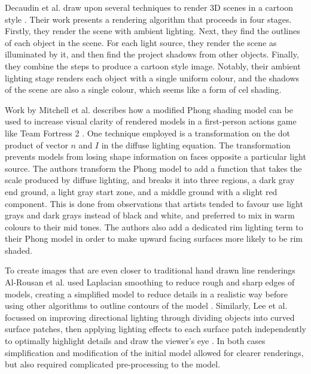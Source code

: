 Decaudin et al. draw upon several techniques to render 3D scenes in a cartoon style 
\cite{decaudin96}. Their work presents a rendering algorithm that proceeds in four stages. 
Firstly, they render the scene with ambient lighting. Next, they find the outlines of each 
object in the scene. For each light source, they render the scene as illuminated by it, and 
then find the project shadows from other objects. Finally, they combine the steps to produce 
a cartoon style image. Notably, their ambient lighting stage renders each object with a 
single uniform colour, and the shadows of the scene are also a single colour, which seems 
like a form of cel shading.

Work by Mitchell et al. describes how a modified Phong shading model can be used to increase visual
clarity of rendered models in a first-person actions game like Team Fortress 2 \cite{mitchell07}. One 
technique employed is a transformation on the dot product of vector $n$ and $I$ in 
the diffuse lighting equation. The transformation prevents models from losing shape information
on faces opposite a particular light source. The authors transform the Phong model
to add a function that takes the scale produced by diffuse lighting, and breaks it into three 
regions, a dark gray end ground, a light gray start zone, and a middle ground with a slight 
red component. This is done from observations that artists tended to favour use light grays and
dark grays instead of black and white, and preferred to mix in warm colours to their mid tones. 
The authors also add a dedicated rim lighting term to their Phong model in order to make upward
facing surfaces more likely to be rim shaded.

To create images that are even closer to traditional hand drawn line renderings Al-Rousan et al. used 
Laplacian smoothing to reduce rough and sharp edges of models, creating a simplified model to reduce 
details in a realistic way before using other algorithms to outline contours of the model \cite{riyad16}. 
Similarly, Lee et al. focussed on improving directional lighting through dividing objects into curved 
surface patches, then applying lighting effects to each surface patch independently to optimally 
highlight details and draw the viewer's eye \cite{lee06}. In both cases simplification and modification 
of the initial model allowed for clearer renderings, but also required complicated pre-processing to the 
model.